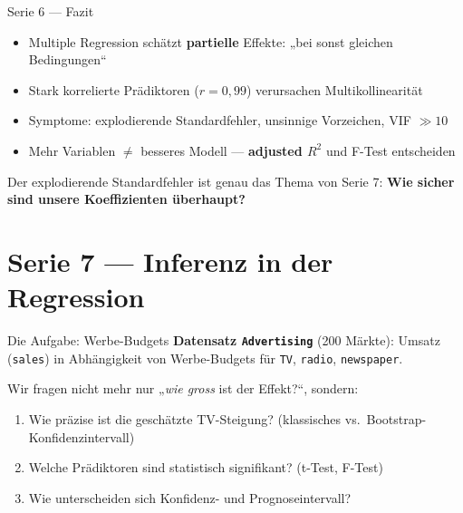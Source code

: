 \documentclass[aspectratio=169,11pt]{beamer}
\begin{document}
\begin{frame}{Serie 6 --- Fazit}
\begin{itemize}
  \item Multiple Regression schätzt \textbf{partielle} Effekte: „bei sonst
        gleichen Bedingungen``
  \item Stark korrelierte Prädiktoren ($r = 0{,}99$) verursachen
        \alert{Multikollinearität}
  \item Symptome: explodierende Standardfehler, unsinnige Vorzeichen, VIF $\gg 10$
  \item Mehr Variablen $\ne$ besseres Modell --- \textbf{adjusted $R^2$} und
        F-Test entscheiden
\end{itemize}
\vspace{0.3cm}
\begin{merke}
Der explodierende Standardfehler ist genau das Thema von Serie 7:
\textbf{Wie sicher sind unsere Koeffizienten überhaupt?}
\end{merke}
\end{frame}

\section{Serie 7 --- Inferenz in der Regression}

\begin{frame}{Die Aufgabe: Werbe-Budgets}
\textbf{Datensatz \texttt{Advertising}} (200 Märkte): Umsatz (\texttt{sales})
in Abhängigkeit von Werbe-Budgets für \texttt{TV}, \texttt{radio},
\texttt{newspaper}.

\vspace{0.3cm}
Wir fragen nicht mehr nur „\emph{wie gross} ist der Effekt?{}``, sondern:
\begin{enumerate}
  \item Wie \alert{präzise} ist die geschätzte TV-Steigung?
        (klassisches vs.\ Bootstrap-Konfidenzintervall)
  \item Welche Prädiktoren sind \alert{statistisch signifikant}?
        (t-Test, F-Test)
  \item Wie unterscheiden sich \alert{Konfidenz-} und
        \alert{Prognoseintervall}?
\end{enumerate}
\end{frame}
\end{document}
